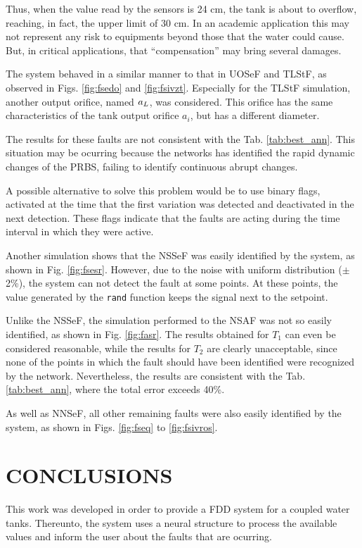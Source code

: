 \documentclass[10pt,fleqn,a4paper]{article}
\begin{document}
Thus, when the value read by the sensors is 24 cm, the tank is about to
overflow, reaching, in fact, the upper limit of 30 cm. In an academic
application this may not represent any risk to equipments beyond those that
the water could cause. But, in critical applications, that ``compensation''
may bring several damages.

The system behaved in a similar manner to that in UOSeF and TLStF, as observed
in Figs. \ref{fig:fsedo} and \ref{fig:fsivzt}. Especially for the TLStF
simulation, another output orifice, named $a_{\tiny L}$, was considered. This
orifice has the same characteristics of the tank output orifice $a_i$, but has a
different diameter.

The results for these faults are not consistent with the Tab.
\ref{tab:best_ann}. This situation may be ocurring because the networks has
identified the rapid dynamic changes of the PRBS, failing to identify continuous
abrupt changes.

A possible alternative to solve this problem would be to use binary flags,
activated at the time that the first variation was detected and deactivated in
the next detection. These flags indicate that the faults are acting during the
time interval in which they were active.

Another simulation shows that the NSSeF was easily identified by the system, as
shown in Fig. \ref{fig:fsesr}. However, due to the noise with uniform
distribution ($\pm$2\%), the system can not detect the fault at some points. At
these points, the value generated by the {\tt rand} function keeps the signal
next to the setpoint.

Unlike the NSSeF, the simulation performed to the NSAF was not so easily
identified, as shown in Fig. \ref{fig:fasr}. The results obtained for $T_1$ can
even be considered reasonable, while the results for $T_2$ are clearly
unacceptable, since none of the points in which the fault should have been
identified were recognized by the network. Nevertheless, the results are
consistent with the Tab. \ref{tab:best_ann}, where the total error exceeds 40\%.

As well as NNSeF, all other remaining faults were also easily identified by the
system, as shown in Figs. \ref{fig:fseq} to \ref{fig:fsivros}.

\section{CONCLUSIONS}\label{sec:conclusions}
This work was developed in order to provide a FDD system for a coupled water
tanks. Thereunto, the system uses a neural structure to process the available
values and inform the user about the faults that are ocurring.
\end{document}

